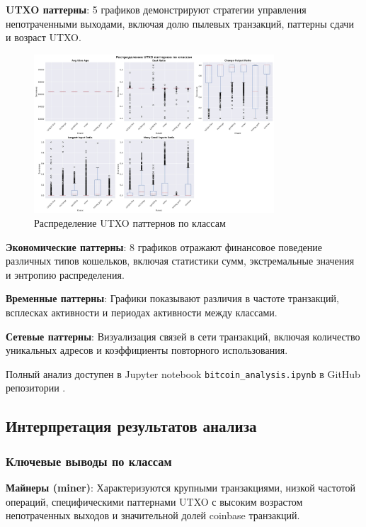 \textbf{UTXO паттерны}: 5 графиков демонстрируют стратегии управления непотраченными выходами, включая долю пылевых транзакций, паттерны сдачи и возраст UTXO.

\begin{figure}[H]
\centering
\includegraphics[width=0.8\textwidth]{bitcoin_data_collector/images/utxo_patterns.jpg}
\caption{Распределение UTXO паттернов по классам}
\label{fig:utxo_patterns}
\end{figure}

\textbf{Экономические паттерны}: 8 графиков отражают финансовое поведение различных типов кошельков, включая статистики сумм, экстремальные значения и энтропию распределения.

\textbf{Временные паттерны}: Графики показывают различия в частоте транзакций, всплесках активности и периодах активности между классами.

\textbf{Сетевые паттерны}: Визуализация связей в сети транзакций, включая количество уникальных адресов и коэффициенты повторного использования.

Полный анализ доступен в Jupyter notebook \texttt{bitcoin\_analysis.ipynb} в GitHub репозитории \cite{github_repo}.

\subsection{Интерпретация результатов анализа}

\subsubsection{Ключевые выводы по классам}

\textbf{Майнеры (miner)}: Характеризуются крупными транзакциями, низкой частотой операций, специфическими паттернами UTXO с высоким возрастом непотраченных выходов и значительной долей coinbase транзакций.

